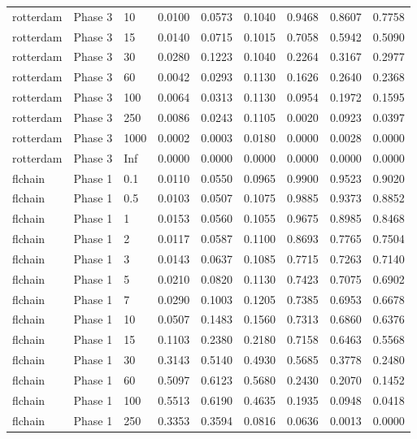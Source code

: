 \begin{tabular}{lllllllll}
  rotterdam & Phase 3 & 10 & 0.0100 & 0.0573 & 0.1040 & 0.9468 & 0.8607 & 0.7758 \\ 
  rotterdam & Phase 3 & 15 & 0.0140 & 0.0715 & 0.1015 & 0.7058 & 0.5942 & 0.5090 \\ 
  rotterdam & Phase 3 & 30 & 0.0280 & 0.1223 & 0.1040 & 0.2264 & 0.3167 & 0.2977 \\ 
  rotterdam & Phase 3 & 60 & 0.0042 & 0.0293 & 0.1130 & 0.1626 & 0.2640 & 0.2368 \\ 
  rotterdam & Phase 3 & 100 & 0.0064 & 0.0313 & 0.1130 & 0.0954 & 0.1972 & 0.1595 \\ 
  rotterdam & Phase 3 & 250 & 0.0086 & 0.0243 & 0.1105 & 0.0020 & 0.0923 & 0.0397 \\ 
  rotterdam & Phase 3 & 1000 & 0.0002 & 0.0003 & 0.0180 & 0.0000 & 0.0028 & 0.0000 \\ 
  rotterdam & Phase 3 & Inf & 0.0000 & 0.0000 & 0.0000 & 0.0000 & 0.0000 & 0.0000 \\ 
  flchain & Phase 1 & 0.1 & 0.0110 & 0.0550 & 0.0965 & 0.9900 & 0.9523 & 0.9020 \\ 
  flchain & Phase 1 & 0.5 & 0.0103 & 0.0507 & 0.1075 & 0.9885 & 0.9373 & 0.8852 \\ 
  flchain & Phase 1 & 1 & 0.0153 & 0.0560 & 0.1055 & 0.9675 & 0.8985 & 0.8468 \\ 
  flchain & Phase 1 & 2 & 0.0117 & 0.0587 & 0.1100 & 0.8693 & 0.7765 & 0.7504 \\ 
  flchain & Phase 1 & 3 & 0.0143 & 0.0637 & 0.1085 & 0.7715 & 0.7263 & 0.7140 \\ 
  flchain & Phase 1 & 5 & 0.0210 & 0.0820 & 0.1130 & 0.7423 & 0.7075 & 0.6902 \\ 
  flchain & Phase 1 & 7 & 0.0290 & 0.1003 & 0.1205 & 0.7385 & 0.6953 & 0.6678 \\ 
  flchain & Phase 1 & 10 & 0.0507 & 0.1483 & 0.1560 & 0.7313 & 0.6860 & 0.6376 \\ 
  flchain & Phase 1 & 15 & 0.1103 & 0.2380 & 0.2180 & 0.7158 & 0.6463 & 0.5568 \\ 
  flchain & Phase 1 & 30 & 0.3143 & 0.5140 & 0.4930 & 0.5685 & 0.3778 & 0.2480 \\ 
  flchain & Phase 1 & 60 & 0.5097 & 0.6123 & 0.5680 & 0.2430 & 0.2070 & 0.1452 \\ 
  flchain & Phase 1 & 100 & 0.5513 & 0.6190 & 0.4635 & 0.1935 & 0.0948 & 0.0418 \\ 
  flchain & Phase 1 & 250 & 0.3353 & 0.3594 & 0.0816 & 0.0636 & 0.0013 & 0.0000 \\ 

\end{tabular}
